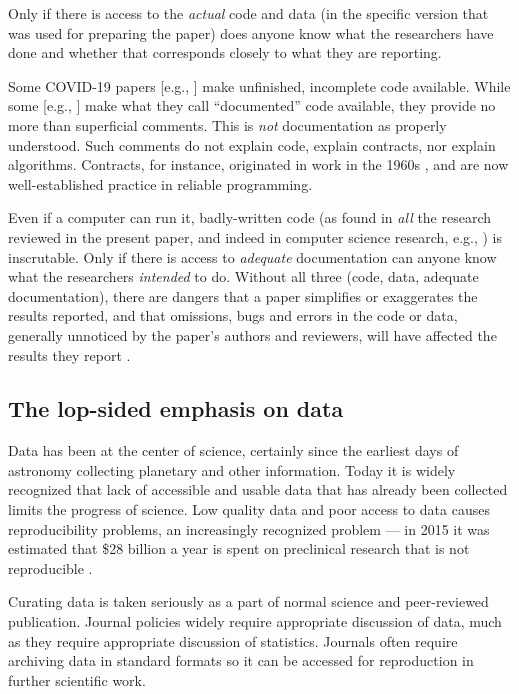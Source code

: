 \documentclass{comjnl}
\def\citeeg#1{[e.g., \citenum{#1}]}
\begin{document}
Only if there is access to the \emph{actual\/} code and data (in the specific version that was used for preparing the paper) does anyone know what the researchers have done and whether that corresponds closely to what they are reporting.

Some COVID-19 papers \citeeg{unfinished} make unfinished, incomplete code available. While some \citeeg{unfinished,lancet-unfinished} make what they call ``documented'' code available, they provide no more than superficial comments. This is \emph{not\/} documentation as properly understood. Such comments do not explain code, explain contracts, nor explain algorithms. Contracts, for instance, originated in work in the 1960s \cite{hoare}, and are now well-established practice in reliable programming.

Even if a computer can run it, badly-written code (as found in \emph{all\/} the research reviewed in the present paper, and indeed in computer science research, e.g., \cite{machine-learning-reproducibility}) is inscrutable. Only if there is access to \emph{adequate\/} documentation can anyone know what the researchers \emph{intended\/} to do. Without all three (code, data, adequate documentation), there are dangers that a paper simplifies or exaggerates the results reported, and that omissions, bugs and errors in the code or data, generally unnoticed by the paper's authors and reviewers, will have affected the results they report \cite{relit}. 

\label{section-discussion}
\subsection{The lop-sided emphasis on data}
\label{critique-fair}
Data has been at the center of science, certainly since the earliest days of astronomy collecting planetary and other information. Today it is widely recognized that lack of accessible and usable data that has already been collected limits the progress of science. Low quality data and poor access to data causes reproducibility problems, an increasingly recognized problem --- in 2015 it was estimated that \$28 billion a year is spent on preclinical research that is not reproducible \cite{preclinical-reproducibility}.

Curating data is taken seriously as a part of normal science and peer-reviewed publication. Journal policies widely require appropriate discussion of data, much as they require appropriate discussion of statistics. Journals often require archiving data in standard formats so it can be accessed for reproduction in further scientific work. 
\end{document}
